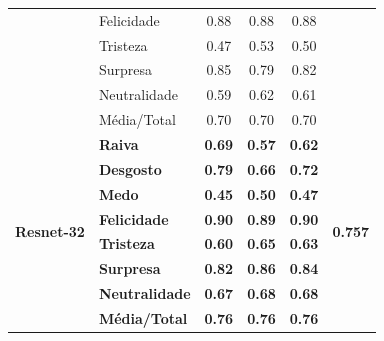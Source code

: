\begin{table}[]
\begin{tabular}{llcccc}
                                    & Felicidade            & 0.88              & 0.88               & 0.88              &                                 \\
                                    & Tristeza              & 0.47              & 0.53               & 0.50              &                                 \\
                                    & Surpresa              & 0.85              & 0.79               & 0.82              &                                 \\
                                    & Neutralidade          & 0.59              & 0.62               & 0.61              &                                 \\
                                    & Média/Total           & 0.70              & 0.70               & 0.70              &                                 \\ \hline
\multirow{8}{*}{\textbf{Resnet-32}} & \textbf{Raiva}        & \textbf{0.69}     & \textbf{0.57}      & \textbf{0.62}     & \multirow{8}{*}{\textbf{0.757}} \\
                                    & \textbf{Desgosto}     & \textbf{0.79}     & \textbf{0.66}      & \textbf{0.72}     &                                 \\
                                    & \textbf{Medo}         & \textbf{0.45}     & \textbf{0.50}      & \textbf{0.47}     &                                 \\
                                    & \textbf{Felicidade}   & \textbf{0.90}     & \textbf{0.89}      & \textbf{0.90}     &                                 \\
                                    & \textbf{Tristeza}     & \textbf{0.60}     & \textbf{0.65}      & \textbf{0.63}     &                                 \\
                                    & \textbf{Surpresa}     & \textbf{0.82}     & \textbf{0.86}      & \textbf{0.84}     &                                 \\
                                    & \textbf{Neutralidade} & \textbf{0.67}     & \textbf{0.68}      & \textbf{0.68}     &                                 \\
                                    & \textbf{Média/Total}  & \textbf{0.76}     & \textbf{0.76}      & \textbf{0.76}     &                                 \\ \hline
\end{tabular}
\end{table}